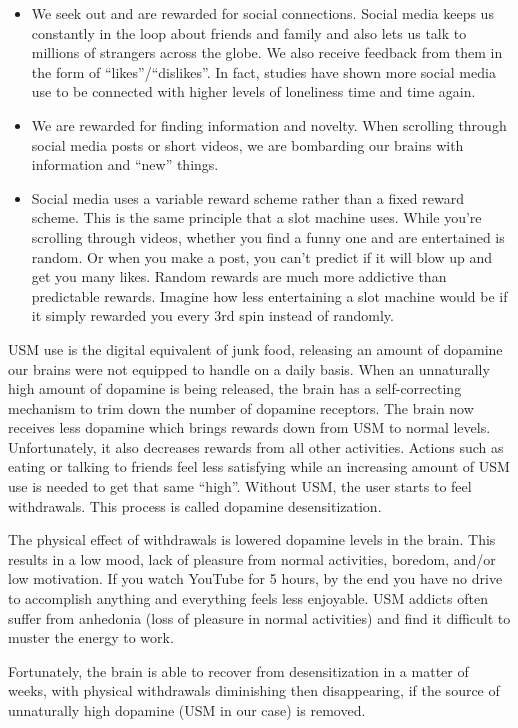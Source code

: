 \documentclass[
  openany]{book}
\providecommand{\tightlist}{%
  \setlength{\itemsep}{0pt}\setlength{\parskip}{0pt}}
\begin{document}
\begin{itemize}
\tightlist
\item
  We seek out and are rewarded for social connections. Social media keeps us constantly in the loop about friends and family and also lets us talk to millions of strangers across the globe. We also receive feedback from them in the form of ``likes''/``dislikes''. In fact, studies have shown more social media use to be connected with higher levels of loneliness time and time again.
\item
  We are rewarded for finding information and novelty. When scrolling through social media posts or short videos, we are bombarding our brains with information and ``new'' things.
\item
  Social media uses a variable reward scheme rather than a fixed reward scheme. This is the same principle that a slot machine uses. While you're scrolling through videos, whether you find a funny one and are entertained is random. Or when you make a post, you can't predict if it will blow up and get you many likes. Random rewards are much more addictive than predictable rewards. Imagine how less entertaining a slot machine would be if it simply rewarded you every 3rd spin instead of randomly.
\end{itemize}

USM use is the digital equivalent of junk food, releasing an amount of dopamine our brains were not equipped to handle on a daily basis. When an unnaturally high amount of dopamine is being released, the brain has a self-correcting mechanism to trim down the number of dopamine receptors. The brain now receives less dopamine which brings rewards down from USM to normal levels. Unfortunately, it also decreases rewards from all other activities. Actions such as eating or talking to friends feel less satisfying while an increasing amount of USM use is needed to get that same ``high''. Without USM, the user starts to feel withdrawals. This process is called dopamine desensitization.

The physical effect of withdrawals is lowered dopamine levels in the brain. This results in a low mood, lack of pleasure from normal activities, boredom, and/or low motivation. If you watch YouTube for 5 hours, by the end you have no drive to accomplish anything and everything feels less enjoyable. USM addicts often suffer from anhedonia (loss of pleasure in normal activities) and find it difficult to muster the energy to work.

Fortunately, the brain is able to recover from desensitization in a matter of weeks, with physical withdrawals diminishing then disappearing, if the source of unnaturally high dopamine (USM in our case) is removed.
\end{document}
